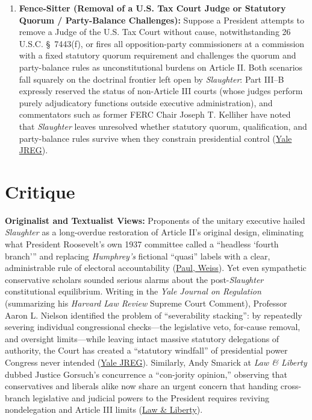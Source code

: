 \documentclass[12pt]{article}
\begin{document}
\begin{enumerate}
    \item \textbf{Fence-Sitter (Removal of a U.S. Tax Court Judge or Statutory Quorum / Party-Balance Challenges):} Suppose a President attempts to remove a Judge of the U.S. Tax Court without cause, notwithstanding 26 U.S.C. \S~7443(f), or fires all opposition-party commissioners at a commission with a fixed statutory quorum requirement and challenges the quorum and party-balance rules as unconstitutional burdens on Article II. Both scenarios fall squarely on the doctrinal frontier left open by \textit{Slaughter}: Part III--B expressly reserved the status of non-Article III courts (whose judges perform purely adjudicatory functions outside executive administration), and commentators such as former FERC Chair Joseph T. Kelliher have noted that \textit{Slaughter} leaves unresolved whether statutory quorum, qualification, and party-balance rules survive when they constrain presidential control (\href{https://www.yalejreg.com/nc/implications-of-trump-v-slaughter-for-the-integrity-of-future-federal-commission-decisionmaking/}{Yale JREG}).
\end{enumerate}

\section{Critique}

\textbf{Originalist and Textualist Views:} Proponents of the unitary executive hailed \textit{Slaughter} as a long-overdue restoration of Article II's original design, eliminating what President Roosevelt's own 1937 committee called a ``headless `fourth branch''' and replacing \textit{Humphrey's} fictional ``quasi'' labels with a clear, administrable rule of electoral accountability (\href{https://www.paulweiss.com/insights/client-memos/supreme-court-overrules-humphrey-s-executor-but-preserves-the-fed-s-independence}{Paul, Weiss}). Yet even sympathetic conservative scholars sounded serious alarms about the post-\textit{Slaughter} constitutional equilibrium. Writing in the \textit{Yale Journal on Regulation} (summarizing his \textit{Harvard Law Review} Supreme Court Comment), Professor Aaron L. Nielson identified the problem of ``severability stacking'': by repeatedly severing individual congressional checks---the legislative veto, for-cause removal, and oversight limits---while leaving intact massive statutory delegations of authority, the Court has created a ``statutory windfall'' of presidential power Congress never intended (\href{https://www.yalejreg.com/nc/the-american-presidency-post-slaughter/}{Yale JREG}). Similarly, Andy Smarick at \textit{Law \& Liberty} dubbed Justice Gorsuch's concurrence a ``con-jority opinion,'' observing that conservatives and liberals alike now share an urgent concern that handing cross-branch legislative and judicial powers to the President requires reviving nondelegation and Article III limits (\href{https://lawliberty.org/gorsuchs-con-jority-opinion-in-slaughter/}{Law \& Liberty}).
\end{document}
